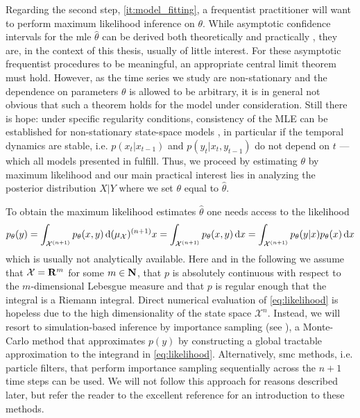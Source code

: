 Regarding the second step, \cref{it:model_fitting}, a frequentist practitioner will want to perform maximum likelihood inference on $\theta$.
While asymptotic confidence intervals for the \gls{mle} $\hat\theta$ can be derived both theoretically and practically \citep[Chapter 7]{Durbin2012Time}, they are, in the context of this thesis, usually of little interest. For these asymptotic frequentist procedures to be meaningful, an appropriate central limit theorem must hold. However, as the time series we study are non-stationary and the dependence on parameters $\theta$ is allowed to be arbitrary, it is in general not obvious that such a theorem holds for the model under consideration. 
Still there is hope: under specific regularity conditions, consistency of the MLE can be established for non-stationary state-space models \citep{Douc2011Consistency}, in particular if the temporal dynamics are stable, i.e. $p(x_{t}|x_{t-1})$ and $p(y_{t}|x_{t}, y_{t - 1})$ do not depend on $t$ --- which all models presented in  fulfill. Thus, we proceed by estimating $\theta$ by maximum likelihood and our main practical interest lies in analyzing the posterior distribution $X|Y$ where we set $\theta$ equal to $\hat\theta$. 

To obtain the maximum likelihood estimates $\hat\theta$ one needs access to the likelihood
\begin{align}
    \label{eq:likelihood}
    p_{\theta}(y) = \int_{\mathcal X^{(n + 1)}} p_{\theta}(x,y) \,\mathrm d (\mu_{\mathcal X})^{(n+1)}x =\int_{\mathcal X^{(n + 1)}} p_{\theta}(x,y) \,\mathrm d x = \int_{\mathcal X^{(n + 1)}} p_{\theta}(y|x) p_{\theta}(x) \,\mathrm d x
\end{align}
which is usually not analytically available. Here and in the following we assume that $\mathcal X = \mathbf R^{m}$ for some $m \in \mathbf N$, that $p$ is absolutely continuous with respect to the $m$-dimensional Lebesgue measure and that $p$ is regular enough that the integral is a Riemann integral.
Direct numerical evaluation of \eqref{eq:likelihood} is hopeless due to the high dimensionality of the state space $\mathcal X^n$.
Instead, we will resort to simulation-based inference by importance sampling (see ), a Monte-Carlo method that approximates $p(y)$ by constructing a global tractable approximation to the integrand in \eqref{eq:likelihood}. Alternatively, \gls{smc} methods, i.e. particle filters, that perform importance sampling sequentially across the $n + 1$ time steps can be used. We will not follow this approach for reasons described later, but refer the reader to the excellent reference \citep{Chopin2020Introduction} for an introduction to these methods.

